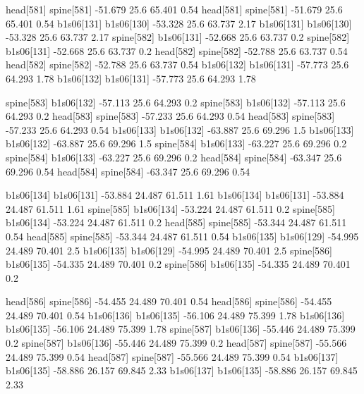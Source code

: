 head[581]    spine[581]    -51.679    25.6    65.401    0.54
head[581]    spine[581]    -51.679    25.6    65.401    0.54
b1s06[131]    b1s06[130]    -53.328    25.6    63.737    2.17
b1s06[131]    b1s06[130]    -53.328    25.6    63.737    2.17
spine[582]    b1s06[131]    -52.668    25.6    63.737    0.2
spine[582]    b1s06[131]    -52.668    25.6    63.737    0.2
head[582]    spine[582]    -52.788    25.6    63.737    0.54
head[582]    spine[582]    -52.788    25.6    63.737    0.54
b1s06[132]    b1s06[131]    -57.773    25.6    64.293    1.78
b1s06[132]    b1s06[131]    -57.773    25.6    64.293    1.78


spine[583]    b1s06[132]    -57.113    25.6    64.293    0.2
spine[583]    b1s06[132]    -57.113    25.6    64.293    0.2
head[583]    spine[583]    -57.233    25.6    64.293    0.54
head[583]    spine[583]    -57.233    25.6    64.293    0.54
b1s06[133]    b1s06[132]    -63.887    25.6    69.296    1.5
b1s06[133]    b1s06[132]    -63.887    25.6    69.296    1.5
spine[584]    b1s06[133]    -63.227    25.6    69.296    0.2
spine[584]    b1s06[133]    -63.227    25.6    69.296    0.2
head[584]    spine[584]    -63.347    25.6    69.296    0.54
head[584]    spine[584]    -63.347    25.6    69.296    0.54


b1s06[134]    b1s06[131]    -53.884    24.487    61.511    1.61
b1s06[134]    b1s06[131]    -53.884    24.487    61.511    1.61
spine[585]    b1s06[134]    -53.224    24.487    61.511    0.2
spine[585]    b1s06[134]    -53.224    24.487    61.511    0.2
head[585]    spine[585]    -53.344    24.487    61.511    0.54
head[585]    spine[585]    -53.344    24.487    61.511    0.54
b1s06[135]    b1s06[129]    -54.995    24.489    70.401    2.5
b1s06[135]    b1s06[129]    -54.995    24.489    70.401    2.5
spine[586]    b1s06[135]    -54.335    24.489    70.401    0.2
spine[586]    b1s06[135]    -54.335    24.489    70.401    0.2


head[586]    spine[586]    -54.455    24.489    70.401    0.54
head[586]    spine[586]    -54.455    24.489    70.401    0.54
b1s06[136]    b1s06[135]    -56.106    24.489    75.399    1.78
b1s06[136]    b1s06[135]    -56.106    24.489    75.399    1.78
spine[587]    b1s06[136]    -55.446    24.489    75.399    0.2
spine[587]    b1s06[136]    -55.446    24.489    75.399    0.2
head[587]    spine[587]    -55.566    24.489    75.399    0.54
head[587]    spine[587]    -55.566    24.489    75.399    0.54
b1s06[137]    b1s06[135]    -58.886    26.157    69.845    2.33
b1s06[137]    b1s06[135]    -58.886    26.157    69.845    2.33


